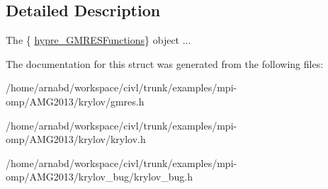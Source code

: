 \subsection{Detailed Description}
The \{ \hyperlink{structhypre__GMRESFunctions}{hypre\+\_\+\+G\+M\+R\+E\+S\+Functions}\} object ... 

The documentation for this struct was generated from the following files\+:\begin{DoxyCompactItemize}
\item 
/home/arnabd/workspace/civl/trunk/examples/mpi-\/omp/\+A\+M\+G2013/krylov/gmres.\+h\item 
/home/arnabd/workspace/civl/trunk/examples/mpi-\/omp/\+A\+M\+G2013/krylov/krylov.\+h\item 
/home/arnabd/workspace/civl/trunk/examples/mpi-\/omp/\+A\+M\+G2013/krylov\+\_\+bug/krylov\+\_\+bug.\+h\end{DoxyCompactItemize}
